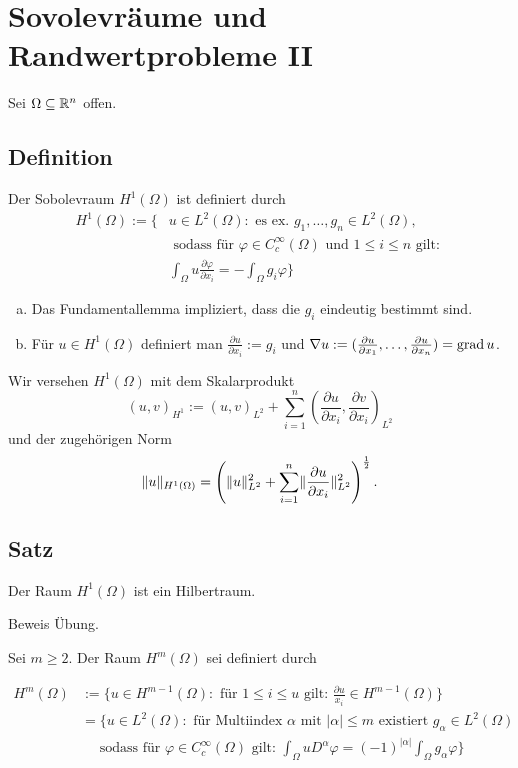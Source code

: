 \section{Sovolevräume und Randwertprobleme II}

Sei $\Omega \subseteq \mathbb{R}^n$ offen.

\subsection{Definition}

Der Sobolevraum $H^1(\Omega)$ ist definiert durch
\begin{align*}
H^1(\Omega) := \{&u \in L^2(\Omega) \colon \text{ es ex. } g_1, \dots, g_n \in L^2(\Omega), \\
                 &\text{ sodass für } \varphi \in C_c^\infty(\Omega) \text{ und } 1 \leq i \leq n \text{ gilt: } \\
                 & \int_\Omega u \frac{\partial \varphi}{\partial x_i} = - \int_\Omega g_i \varphi \}
\end{align*}

\begin{bem}
  \begin{enumerate}[a)]
  \item Das Fundamentallemma impliziert, dass die $g_i$ eindeutig bestimmt sind.
  \item Für $u \in H^1(\Omega)$ definiert man $\frac{\partial u}{\partial x_i} := g_i$ und $\nabla u := ( \frac{\partial u}{\partial x_1}, \dots, \frac{\partial u}{\partial x_n}) = \operatorname{grad} u$.
\end{enumerate}
\end{bem}

Wir versehen $H^1(\Omega)$ mit dem Skalarprodukt
$$
(u,v)_{H^1} := (u,v)_{L^2} + \sum_{i = 1}^n (\frac{\partial u}{\partial x_i}, \frac{\partial v}{\partial x_i})_{L^2}
$$
und der zugehörigen Norm
$$
\lVert u \rVert_{H^1(\Omega)} = \left(\lVert u \rVert_{L^2}^2 + \sum_{i = 1}^n \lVert \frac{\partial u}{\partial x_i} \rVert_{L^2}^2 \right)^{\frac{1}{2}}.
$$

\subsection{Satz}

Der Raum $H^1(\Omega)$ ist ein Hilbertraum.

Beweis Übung.

Sei $m \geq 2$. Der Raum $H^m(\Omega)$ sei definiert durch

\begin{align*}
H^m(\Omega) 
&:=  \{ u \in H^{m - 1}(\Omega) \colon \text{ für } 1 \leq i \leq u \text{ gilt: } \frac{\partial u}{x_i} \in H^{m-1}(\Omega) \} \\
& = \{u \in L^2(\Omega) \colon \text{ für Multiindex } \alpha \text{ mit } |\alpha| \leq m \text{ existiert } g_\alpha \in L^2(\Omega) \\
      &\quad\text{ sodass für } \varphi \in C_c^\infty(\Omega) \text{ gilt: } \int_\Omega u D^\alpha \varphi = (-1)^{|\alpha|} \int_\Omega g_\alpha \varphi \}
\end{align*}

